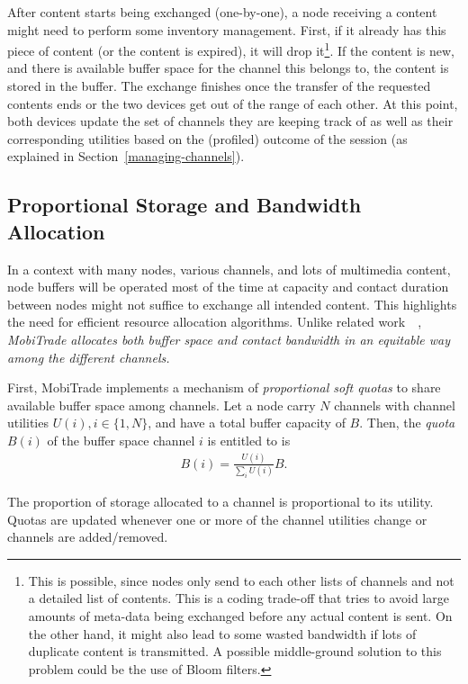 After content starts being exchanged (one-by-one), a node receiving a content might need to perform some inventory management. First, if it already has this piece of content (or the content is expired), it will drop it\footnote{This is possible, since nodes only send to each other lists of channels and not a detailed list of contents. This is a coding trade-off that tries to avoid large amounts of meta-data being exchanged before any actual content is sent. On the other hand, it might also lead to some wasted bandwidth if lots of duplicate content is transmitted. A possible middle-ground solution to this problem could be the use of Bloom filters.}. If the content is new, and there is available buffer space for the channel this belongs to, the content is stored in the buffer. The exchange finishes once the transfer of the requested contents ends or the two devices get out of the range of each other. At this point, both devices update the set of channels they are keeping track of as well as their corresponding utilities based on the (profiled) outcome of the session (as explained in Section~\ref{managing-channels}).

\subsection{Proportional Storage and Bandwidth Allocation}
\label{buffer-management}

In a context with many nodes, various channels, and lots of multimedia content, node buffers will be operated most of the time at capacity and contact duration between nodes might not suffice to exchange all intended content. This highlights the need for efficient resource allocation algorithms. Unlike related work~\cite{ContentPlace}~\cite{May07wirelessopportunistic}, \emph{MobiTrade allocates both buffer space and contact bandwidth in an equitable way among the different channels.}

First, MobiTrade implements a mechanism of \emph{proportional soft quotas} to share available buffer space among channels. Let a node carry $N$ channels with channel utilities $U(i), i \in \{1,N\}$, and have a total buffer capacity of $B$. Then, the \emph{quota} $B(i)$ of the buffer space channel $i$ is entitled to is
\begin{eqnarray*}
B(i) = \frac{U(i)}{\sum_{i} U(i)} B.
\end{eqnarray*}

The proportion of storage allocated to a channel is proportional to its utility. Quotas are updated whenever one or more of the channel utilities change or channels are added/removed.

